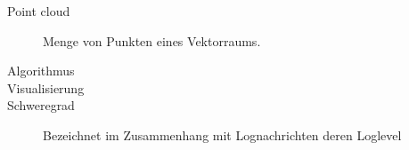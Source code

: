 
\begin{description}
	\item[Point cloud] Menge von Punkten eines Vektorraums.
	\item[Algorithmus]
	\item[Visualisierung]
	\item[Schweregrad] Bezeichnet im Zusammenhang mit Lognachrichten deren Loglevel
\end{description}
